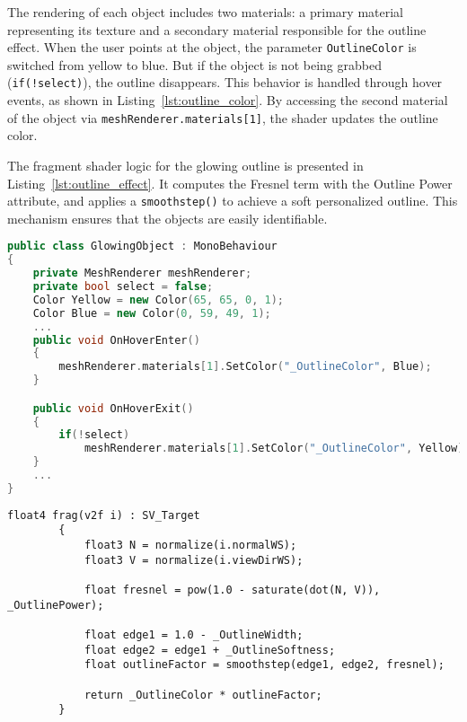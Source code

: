 The rendering of each object includes two materials: a primary material representing its texture and a secondary material responsible for the outline effect.
When the user points at the object, the parameter \texttt{OutlineColor} is switched from yellow to blue. But if the object is not being grabbed (\texttt{if(!select)}), the outline disappears. 
This behavior is handled through hover events, as shown in Listing~\ref{lst:outline_color}. 
By accessing the second material of the object via \texttt{meshRenderer.materials[1]}, the shader updates the outline color.  

The fragment shader logic for the glowing outline is presented in Listing~\ref{lst:outline_effect}. 
It computes the Fresnel term with the Outline Power attribute, and applies a \texttt{smoothstep()} to achieve a soft personalized outline.  
This mechanism ensures that the objects are easily identifiable. 


\begin{lstlisting}[language=C++, caption={Partial class with Outline Color changed when the object is Hovered.}, label={lst:outline_color}]
    public class GlowingObject : MonoBehaviour
{
    private MeshRenderer meshRenderer;
    private bool select = false;
    Color Yellow = new Color(65, 65, 0, 1);
    Color Blue = new Color(0, 59, 49, 1);
    ...
    public void OnHoverEnter()
    {
        meshRenderer.materials[1].SetColor("_OutlineColor", Blue);
    }

    public void OnHoverExit()
    {
        if(!select)
            meshRenderer.materials[1].SetColor("_OutlineColor", Yellow);
    }
    ...
}
\end{lstlisting}


\begin{lstlisting}[language=HLSL, caption={Partial Fragment shader for creating an outline effect to the object.}, label={lst:outline_effect}]
        float4 frag(v2f i) : SV_Target
        {
            float3 N = normalize(i.normalWS);
            float3 V = normalize(i.viewDirWS);

            float fresnel = pow(1.0 - saturate(dot(N, V)), _OutlinePower);

            float edge1 = 1.0 - _OutlineWidth;
            float edge2 = edge1 + _OutlineSoftness;
            float outlineFactor = smoothstep(edge1, edge2, fresnel);

            return _OutlineColor * outlineFactor;
        }
\end{lstlisting}

